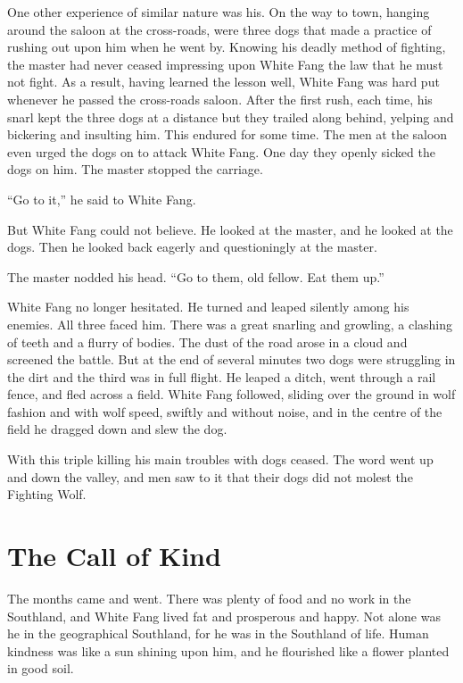 \documentclass[10pt]{book}
\begin{document}
One other experience of similar nature was his. On the way to town,
hanging around the saloon at the cross-roads, were three dogs that made
a practice of rushing out upon him when he went by. Knowing his deadly
method of fighting, the master had never ceased impressing upon White
Fang the law that he must not fight. As a result, having learned the
lesson well, White Fang was hard put whenever he passed the cross-roads
saloon. After the first rush, each time, his snarl kept the three dogs
at a distance but they trailed along behind, yelping and bickering and
insulting him. This endured for some time. The men at the saloon even
urged the dogs on to attack White Fang. One day they openly sicked the
dogs on him. The master stopped the carriage.

“Go to it,” he said to White Fang.

But White Fang could not believe. He looked at the master, and he
looked at the dogs. Then he looked back eagerly and questioningly at
the master.

The master nodded his head. “Go to them, old fellow. Eat them up.”

White Fang no longer hesitated. He turned and leaped silently among his
enemies. All three faced him. There was a great snarling and growling,
a clashing of teeth and a flurry of bodies. The dust of the road arose
in a cloud and screened the battle. But at the end of several minutes
two dogs were struggling in the dirt and the third was in full flight.
He leaped a ditch, went through a rail fence, and fled across a field.
White Fang followed, sliding over the ground in wolf fashion and with
wolf speed, swiftly and without noise, and in the centre of the field
he dragged down and slew the dog.

With this triple killing his main troubles with dogs ceased. The word
went up and down the valley, and men saw to it that their dogs did not
molest the Fighting Wolf.

\chapter{The Call of Kind}

The months came and went. There was plenty of food and no work in the
Southland, and White Fang lived fat and prosperous and happy. Not alone
was he in the geographical Southland, for he was in the Southland of
life. Human kindness was like a sun shining upon him, and he flourished
like a flower planted in good soil.
\end{document}
